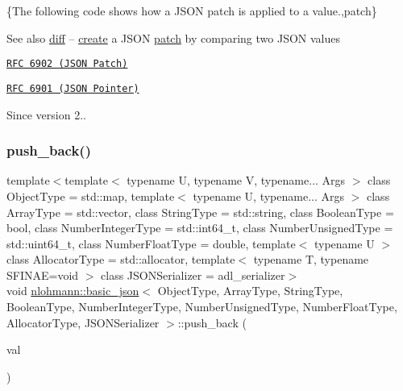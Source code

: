 \{The following code shows how a J\+S\+ON patch is applied to a value.,patch\}

\begin{DoxySeeAlso}{See also}
\mbox{\hyperlink{classnlohmann_1_1basic__json_a9c4f3554773649beef69461a10a3de87}{diff}} -- \mbox{\hyperlink{classnlohmann_1_1basic__json_a7b3ddcc9fb62cc378b0d431c430b91af}{create}} a J\+S\+ON \mbox{\hyperlink{classnlohmann_1_1basic__json_a81e0c41a4a9dff4df2f6973f7f8b2a83}{patch}} by comparing two J\+S\+ON values

\href{https://tools.ietf.org/html/rfc6902}{\tt R\+FC 6902 (J\+S\+ON Patch)} 

\href{https://tools.ietf.org/html/rfc6901}{\tt R\+FC 6901 (J\+S\+ON Pointer)}
\end{DoxySeeAlso}
\begin{DoxySince}{Since}
version 2.. 
\end{DoxySince}
\mbox{\label{classnlohmann_1_1basic__json_ac8e523ddc8c2dd7e5d2daf0d49a9c0d7}} 
\subsubsection{\texorpdfstring{push\+\_\+back()}{push\_back()}\hspace{0.1cm}{\footnotesize\ttfamily [1/4]}}
{\footnotesize\ttfamily template$<$template$<$ typename U, typename V, typename... Args $>$ class Object\+Type = std\+::map, template$<$ typename U, typename... Args $>$ class Array\+Type = std\+::vector, class String\+Type  = std\+::string, class Boolean\+Type  = bool, class Number\+Integer\+Type  = std\+::int64\+\_\+t, class Number\+Unsigned\+Type  = std\+::uint64\+\_\+t, class Number\+Float\+Type  = double, template$<$ typename U $>$ class Allocator\+Type = std\+::allocator, template$<$ typename T, typename S\+F\+I\+N\+A\+E=void $>$ class J\+S\+O\+N\+Serializer = adl\+\_\+serializer$>$ \\
void \mbox{\hyperlink{classnlohmann_1_1basic__json}{nlohmann\+::basic\+\_\+json}}$<$ Object\+Type, Array\+Type, String\+Type, Boolean\+Type, Number\+Integer\+Type, Number\+Unsigned\+Type, Number\+Float\+Type, Allocator\+Type, J\+S\+O\+N\+Serializer $>$\+::push\+\_\+back (\begin{DoxyParamCaption}\item[{\mbox{\hyperlink{classnlohmann_1_1basic__json}{basic\+\_\+json}}$<$ Object\+Type, Array\+Type, String\+Type, Boolean\+Type, Number\+Integer\+Type, Number\+Unsigned\+Type, Number\+Float\+Type, Allocator\+Type, J\+S\+O\+N\+Serializer $>$ \&\&}]{val }\end{DoxyParamCaption})\hspace{0.3cm}{\ttfamily [inline]}}



